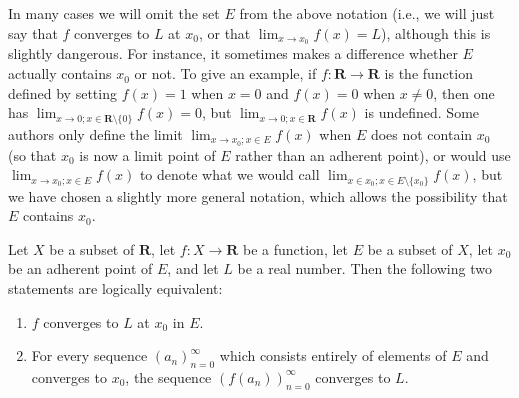 \begin{remark}\label{9.3.7}
    In many cases we will omit the set \(E\) from the above notation (i.e., we will just say that \(f\) converges to \(L\) at \(x_0\), or that \(\lim_{x \to x_0} f(x) = L\)), although this is slightly dangerous.
    For instance, it sometimes makes a difference whether \(E\) actually contains \(x_0\) or not.
    To give an example, if \(f : \mathbf{R} \to \mathbf{R}\) is the function defined by setting \(f(x) = 1\) when \(x = 0\) and \(f(x) = 0\) when \(x \neq 0\), then one has \(\lim_{x \to 0 ; x \in \mathbf{R} \setminus \{0\}} f(x) = 0\), but \(\lim_{x \to 0 ; x \in \mathbf{R}} f(x)\) is undefined.
    Some authors only define the limit \(\lim_{x \to x_0 ; x \in E} f(x)\) when \(E\) does not contain \(x_0\) (so that \(x_0\) is now a limit point of \(E\) rather than an adherent point), or would use \(\lim_{x \to x_0 ; x \in E} f(x)\) to denote what we would call \(\lim_{x \in x_0 ; x \in E \setminus \{x_0\}} f(x)\), but we have chosen a slightly more general notation, which allows the possibility that \(E\) contains \(x_0\).
\end{remark}

\setcounter{theorem}{8}
\begin{proposition}\label{9.3.9}
    Let \(X\) be a subset of \(\mathbf{R}\), let \(f : X \to \mathbf{R}\) be a function, let \(E\) be a subset of \(X\), let \(x_0\) be an adherent point of \(E\), and let \(L\) be a real number.
    Then the following two statements are logically equivalent:
    \begin{enumerate}
        \item \(f\) converges to \(L\) at \(x_0\) in \(E\).
        \item For every sequence \((a_n)_{n = 0}^\infty\) which consists entirely of elements of \(E\) and converges to \(x_0\), the sequence \((f(a_n))_{n = 0}^\infty\) converges to \(L\).
    \end{enumerate}
\end{proposition}

